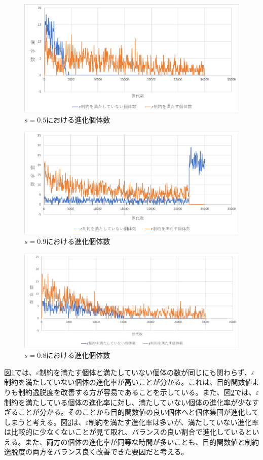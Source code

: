 \documentclass[a4paper,12pt]{jsreport}
\begin{document}
\begin{figure}[htbp]
  \centering
  \includegraphics[width=.7\linewidth]{fig3/evo/s=0.5_evo.eps}
  \caption{$s=0.5$における進化個体数}
  \label{fig:evo0.5}
\end{figure}

\begin{figure}[htbp]
  \centering
  \includegraphics[width=.7\linewidth]{fig3/evo/s=0.9_evo.eps}
  \caption{$s=0.9$における進化個体数}
  \label{fig:evo0.9}
\end{figure}

\begin{figure}[htbp]
  \centering
  \includegraphics[width=.7\linewidth]{fig3/evo/s=0.8_evo.eps}
  \caption{$s=0.8$における進化個体数}
  \label{fig:evo0.8}
\end{figure}

図\ref{fig:evo0.5}では、$\varepsilon$制約を満たす個体と満たしていない個体の数が同じにも関わらず、$\varepsilon$制約を満たしていない個体の進化率が高いことが分かる。これは、目的関数値よりも制約逸脱度を改善する方が容易であることを示している。また、図\ref{fig:evo0.9}では、$\varepsilon$制約を満たしている個体の進化率に対し、満たしていない個体の進化率が少なすぎることが分かる。そのことから目的関数値の良い個体へと個体集団が進化してしまうと考える。図\ref{fig:evo0.8}は、$\varepsilon$制約を満たす進化率は多いが、満たしていない進化率は比較的に少なくないことが見て取れ、バランスの良い割合で進化しているといえる。また、両方の個体の進化率が同等な時間が多いことも、目的関数値と制約逸脱度の両方をバランス良く改善できた要因だと考える。
\end{document}
